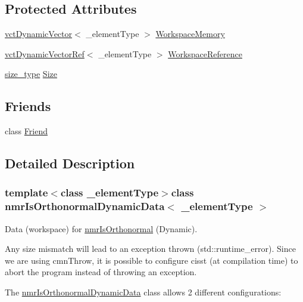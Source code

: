 \subsection*{Protected Attributes}
\begin{DoxyCompactItemize}
\item 
\hyperlink{classvct_dynamic_vector}{vct\-Dynamic\-Vector}$<$ \-\_\-element\-Type $>$ \hyperlink{classnmr_is_orthonormal_dynamic_data_aa64db85fa3c9904a4fb2c917dd171ae6}{Workspace\-Memory}
\item 
\hyperlink{classvct_dynamic_vector_ref}{vct\-Dynamic\-Vector\-Ref}$<$ \-\_\-element\-Type $>$ \hyperlink{classnmr_is_orthonormal_dynamic_data_a70b7864b872ab20af9400584387f3c21}{Workspace\-Reference}
\item 
\hyperlink{classnmr_is_orthonormal_dynamic_data_ae69581f9b270b49b1cd1d16ff29a5409}{size\-\_\-type} \hyperlink{classnmr_is_orthonormal_dynamic_data_a0335e18e8d4291e9c9ce6f6c3b7f68f0}{Size}
\end{DoxyCompactItemize}
\subsection*{Friends}
\begin{DoxyCompactItemize}
\item 
class \hyperlink{classnmr_is_orthonormal_dynamic_data_a7f8321d57e81bc613d5dbef3410ba70e}{Friend}
\end{DoxyCompactItemize}


\subsection{Detailed Description}
\subsubsection*{template$<$class \-\_\-element\-Type$>$class nmr\-Is\-Orthonormal\-Dynamic\-Data$<$ \-\_\-element\-Type $>$}

Data (workspace) for \hyperlink{nmr_is_orthonormal_8h_acf0ff1e2dbe0c988db04d9db1e2e7697}{nmr\-Is\-Orthonormal} (Dynamic). 

Any size mismatch will lead to an exception thrown (std\-::runtime\-\_\-error). Since we are using cmn\-Throw, it is possible to configure cisst (at compilation time) to abort the program instead of throwing an exception.

The \hyperlink{classnmr_is_orthonormal_dynamic_data}{nmr\-Is\-Orthonormal\-Dynamic\-Data} class allows 2 different configurations\-:


